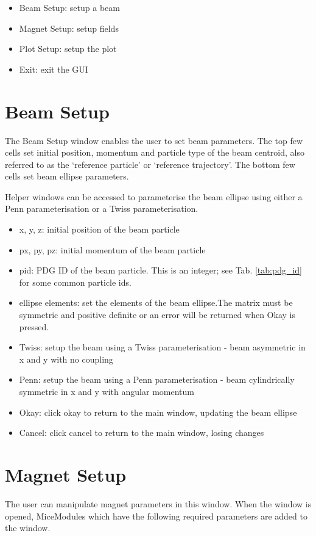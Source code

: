 \begin{itemize}
\item Beam Setup: setup a beam
\item Magnet Setup: setup fields
\item Plot Setup: setup the plot
\item Exit: exit the GUI
\end{itemize}

\section{Beam Setup}

The Beam Setup window enables the user to set beam parameters. The top few cells
set initial position, momentum and particle type of the beam centroid, also
referred to as the `reference particle' or `reference trajectory'. The bottom
few cells set beam ellipse parameters.

Helper windows can be accessed to parameterise the beam ellipse using either a
Penn parameterisation or a
Twiss parameterisation.

\begin{itemize}
\item x, y, z: initial position of the beam particle
\item px, py, pz: initial momentum of the beam particle
\item pid: PDG ID of the beam particle. This is an integer; see Tab. 
\ref{tab:pdg_id} for some common particle ids.
\item ellipse elements: set the elements of the beam ellipse.The matrix must
be symmetric and positive definite or an error will be returned when Okay is
pressed.
\item Twiss: setup the beam using a Twiss parameterisation - beam asymmetric in
x and y with no coupling
\item Penn: setup the beam using a Penn parameterisation - beam cylindrically 
symmetric in x and y with angular momentum
\item Okay: click okay to return to the main window, updating the beam ellipse
\item Cancel: click cancel to return to the main window, losing changes
\end{itemize}

\section{Magnet Setup}
The user can manipulate magnet parameters in this window. When the window is
opened, MiceModules which have the following required parameters are added to
the window.

